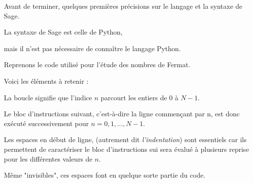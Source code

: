 % 
% 
% 
% 
% 
% 



\diapo

Avant de terminer, quelques premières précisions sur le langage et la syntaxe de Sage.

La syntaxe de Sage est celle de Python,

mais il n'est pas nécessaire de connaître le langage Python.


\change

Reprenons le code utilisé pour l'étude des nombres de Fermat.

\change


Voici les éléments à retenir : 

 La boucle  
 signifie que l'indice $n$ parcourt les entiers de $0$ à  $N-1$.
 
  
\change

Le bloc d'instructions suivant, c'est-à-dire la ligne commençant par  
 n,
  est donc exécuté successivement pour $n=0,1,\ldots,N-1$.
  
\change

Les espaces en début de ligne, (autrement dit \emph{l'indentation}) 
sont essentiels car ils permettent de caractériser le bloc d'instructions sui sera évalué à plusieurs reprise pour les différentes valeurs de $n$.

Même "invisibles", ces espaces font en quelque sorte partie du code.


